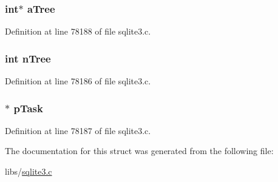 \subsubsection[{a\+Tree}]{\setlength{\rightskip}{0pt plus 5cm}int$\ast$ a\+Tree}\label{struct_merge_engine_af09e1c62e2143bcde90a56e8733257a7}


Definition at line 78188 of file sqlite3.\+c.

\hypertarget{struct_merge_engine_a27deed48b4e7b04d51fa2105eede6f26}{}
\subsubsection[{n\+Tree}]{\setlength{\rightskip}{0pt plus 5cm}int n\+Tree}\label{struct_merge_engine_a27deed48b4e7b04d51fa2105eede6f26}


Definition at line 78186 of file sqlite3.\+c.

\hypertarget{struct_merge_engine_ab1de7a866e3b281bba80ccb606ec2ae1}{}
\subsubsection[{p\+Task}]{$\ast$ p\+Task}\label{struct_merge_engine_ab1de7a866e3b281bba80ccb606ec2ae1}


Definition at line 78187 of file sqlite3.\+c.



The documentation for this struct was generated from the following file\+:\begin{DoxyCompactItemize}
\item 
libs/\hyperlink{sqlite3_8c}{sqlite3.\+c}\end{DoxyCompactItemize}
